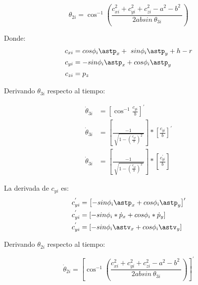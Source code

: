             \begin{equation*}
              \theta _{2i}=\cos ^{-1} \left( \frac{c_{xi}^{2}+c_{yi}^{2}+c_{zi}^{2}- a^{2}-b^{2}~}{2 ab    sin~ \theta _{3i}} \right) 
            \end{equation*}
            
            Donde: 
            \begin{align*}
                 c_{xi}&=cos \phi _{i}\astp_{x}+~ sin \phi _{i}\astp_{y}+h-r \\
                 c_{yi}&=-sin \phi _{i}\astp_{x} + cos \phi _{i}\astp_{y} \\
                 c_{zi}&=p_{z} 
            \end{align*}

            Derivando  $\theta _{3i}$ respecto al tiempo:

            \begin{align*}
                 \dot{ \theta }_{3i}&= \left[ \cos ^{-1}\frac{c_{yi}}{b} \right] ^{'} \\
                 \dot{ \theta }_{3i}&= \left[ \frac{-1}{\sqrt[]{1- \left( \frac{c_{yi}}{b} \right) ^{2}~}} \right] \ast \left[ \frac{c_{yi}}{b} \right] ^{'} \\
                 \dot{ \theta }_{3i}&= \left[ \frac{-1}{\sqrt[]{1- \left( \frac{c_{yi}}{b} \right) ^{2}~}} \right] \ast \left[ \frac{c_{yi}^{'}}{b} \right]  
            \end{align*}

            La derivada de $c_{yi}$ es:
            \begin{align*}
                 c_{yi}^{'}&= \left[ -sin \phi _{i}\astp_{x} + cos \phi _{i}\astp_{y} \right] ' \\
                 c_{yi}^{'}&= \left[ -sin \phi _{i}\ast\dot{p}_{x} + cos \phi _{i}\ast\dot{p}_{y} \right]  \\
                 c_{yi}^{'}&= \left[ -sin \phi _{i}\astv_{x} + cos \phi _{i}\astv_{y} \right] 
            \end{align*}

                        \newpage


            Derivando  $\theta _{2i}$ respecto al tiempo:
            
            \begin{equation*}
                 \dot{ \theta }_{2i}= \left[ \cos ^{-1} \left( \frac{c_{xi}^{2}+c_{yi}^{2}+c_{zi}^{2}- a^{2}-b^{2}~}{2 ab sin~ \theta _{3i}} \right)  \right] ^{'} 
            \end{equation*}
            
